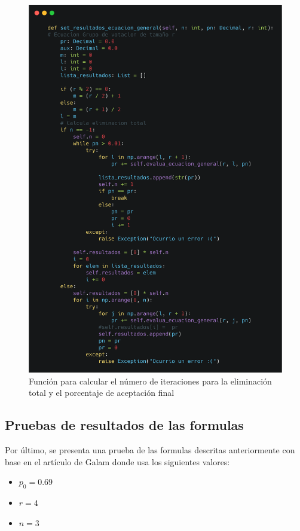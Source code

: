 \begin{figure}[!htb]
    \centering
    \includegraphics[scale=.15]{TT/img/pruebas/pn.png}
    \caption{Función para calcular el número de iteraciones para la eliminación total y el porcentaje de aceptación final}
    \label{graphic:pn}
\end{figure}

\subsection{Pruebas de resultados de las formulas}
Por último, se presenta una prueba de las formulas descritas anteriormente con base en el artículo de Galam \cite{Galam2008} donde usa los siguientes valores:
\begin{itemize}
    \item $p_0 = 0.69$
    \item $r = 4$
    \item $n = 3$
\end{itemize}

